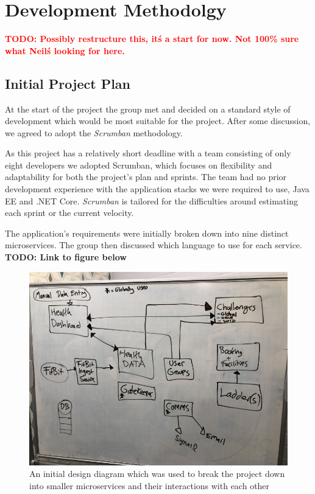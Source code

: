 \chapter{Development Methodolgy}

\textcolor{red}{\textbf{TODO: Possibly restructure this, it\'s a start for now. Not 100\% sure what Neil\'s looking for here.}}

\section{Initial Project Plan}
At the start of the project the group met and decided on a standard style of development which would be most suitable for the project. After some discussion, we agreed to adopt the \textit{Scrumban}\cite{scrumban} methodology. 

\par
As this project has a relatively short deadline with a team consisting of only eight developers we adopted Scrumban, which focuses on flexibility and adaptability for both the project's plan and sprints. 
The team had no prior development experience with the application stacks we were required to use, Java EE and .NET Core. \textit{Scrumban} is tailored for the difficulties around estimating each sprint or the current velocity.

The application's requirements were initially broken down into nine distinct microservices. The group then discussed which language to use for each service. \textbf{TODO: Link to figure below}

\begin{figure}[H]
    \centering
    \includegraphics[width=\textwidth]{Images/Initial_Spec_Chart.jpg}
    \caption{An initial design diagram which was used to break the project down into smaller microservices and their interactions with each other}
\end{figure}

